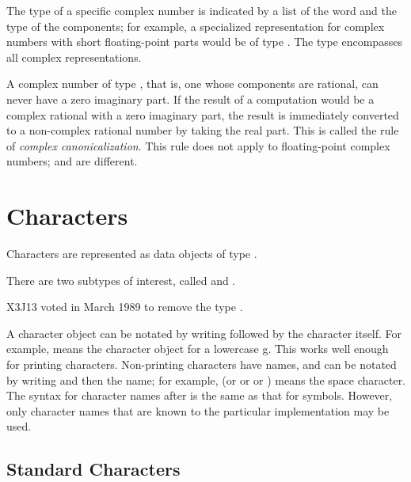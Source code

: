 The type of a specific complex number is indicated by a list
of the word  and the type of the components; for example,
a specialized representation for complex numbers with short floating-point
parts would be of type .  The type 
encompasses all complex representations.

A complex number of type , that is, one whose
components are rational, can never have a zero imaginary part.
If the result of a computation would be a complex rational
with a zero imaginary part, the result is immediately
converted to a non-complex rational number by taking the
real part.  This is called the rule of {\it complex canonicalization}.
This rule does not apply to floating-point complex numbers;
 and  are different.

\goodbreak

\section{Characters}

Characters are represented as data objects of type .
\begin{obsolete}
There are two subtypes of interest,
called  and .
\end{obsolete}
\begin{newer}
X3J13 voted in March 1989  to remove the type .
\end{newer}

A character object can be notated by writing \cd{\#{\Xbackslash}} followed
by the character itself.  For example,  means the character
object for a lowercase g.  This works well enough for printing
characters.  Non-printing characters have names, and can be notated
by writing \cd{\#{\Xbackslash}} and then the name; for example, 
(or  or  or )
means the space character.  The syntax for character names after \cd{\#{\Xbackslash}}
is the same as that for symbols.  However, only character names
that are known to the particular implementation may be used.

\subsection{Standard Characters}

